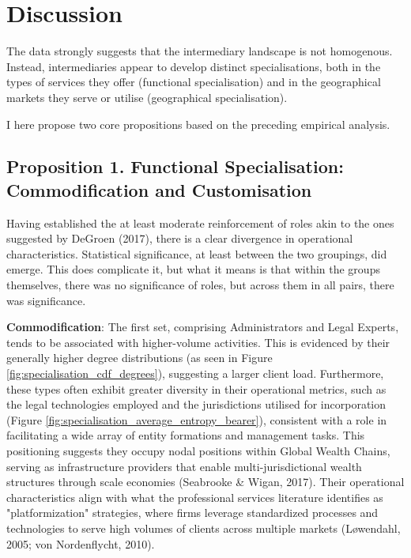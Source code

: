 \chapter{Discussion}
\label{chap:discussion}

The data strongly suggests that the intermediary landscape is not homogenous. Instead, intermediaries appear to develop distinct specialisations, both in the types of services they offer (functional specialisation) and in the geographical markets they serve or utilise (geographical specialisation).

I here propose two core propositions based on the preceding empirical analysis.

\section{Proposition 1. Functional Specialisation: Commodification and Customisation}

Having established the at least moderate reinforcement of roles akin to the ones suggested by DeGroen (2017), there is a clear divergence in operational characteristics. Statistical significance, at least between the two groupings, did emerge. This does complicate it, but what it means is that within the groups themselves, there was no significance of roles, but across them in all pairs, there was significance.

\textbf{Commodification}: The first set, comprising Administrators and Legal Experts, tends to be associated with higher-volume activities. This is evidenced by their generally higher degree distributions (as seen in Figure \ref{fig:specialisation_cdf_degrees}), suggesting a larger client load. Furthermore, these types often exhibit greater diversity in their operational metrics, such as the legal technologies employed and the jurisdictions utilised for incorporation (Figure \ref{fig:specialisation_average_entropy_bearer}), consistent with a role in facilitating a wide array of entity formations and management tasks. This positioning suggests they occupy nodal positions within Global Wealth Chains, serving as infrastructure providers that enable multi-jurisdictional wealth structures through scale economies (Seabrooke \& Wigan, 2017). Their operational characteristics align with what the professional services literature identifies as "platformization" strategies, where firms leverage standardized processes and technologies to serve high volumes of clients across multiple markets (Løwendahl, 2005; von Nordenflycht, 2010).

